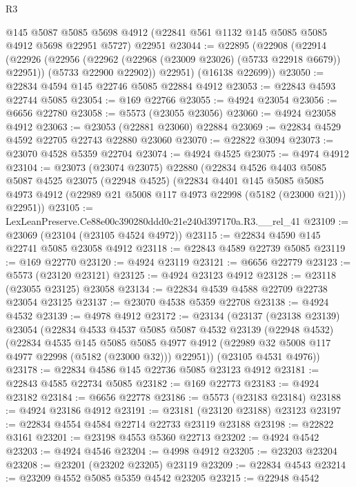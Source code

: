 \begin{lexlean}{R3}
\begin{coremodule}
    @145
    @5087
    @5085
    @5698
    @4912
    (@22841 @561 @1132 @145 @5085 @5085 @4912 @5698 @22951 @5727)
    @22951
@23044 := @22895
    (@22908
      (@22914
        (@22926
          (@22956 (@22962 (@22968 (@23009 @23026) (@5733 @22918 @6679)) @22951))
          (@5733 @22900 @22902))
        @22951)
      (@16138 @22699))
@23050 := @22834 @4594 @145 @22746 @5085 @22884 @4912
@23053 := @22843 @4593 @22744 @5085
@23054 := @169 @22766
@23055 := @4924 @23054
@23056 := @6656 @22780
@23058 := @5573 (@23055 @23056)
@23060 := @4924 @23058 @4912
@23063 := @23053 (@22881 @23060) @22884
@23069 := @22834 @4529 @4592 @22705 @22743 @22880 @23060
@23070 := @22822 @3094
@23073 := @23070 @4528 @5359 @22704
@23074 := @4924 @4525
@23075 := @4974 @4912
@23104 := @23073
    (@23074 @23075)
    @22880
    (@22834
      @4526
      @4403
      @5085
      @5087
      @4525
      @23075
      (@22948 @4525)
      (@22834
        @4401
        @145
        @5085
        @5085
        @4973
        @4912
        (@22989 @21 @5008 @117 @4973 @22998 (@5182 (@23000 @21)))
        @22951))
@23105 := LexLeanPreserve.Ce88e00c390280ddd0c21e240d397170a.R3.__rel_41
@23109 := @23069 (@23104 (@23105 @4524 @4972))
@23115 := @22834 @4590 @145 @22741 @5085 @23058 @4912
@23118 := @22843 @4589 @22739 @5085
@23119 := @169 @22770
@23120 := @4924 @23119
@23121 := @6656 @22779
@23123 := @5573 (@23120 @23121)
@23125 := @4924 @23123 @4912
@23128 := @23118 (@23055 @23125) @23058
@23134 := @22834 @4539 @4588 @22709 @22738 @23054 @23125
@23137 := @23070 @4538 @5359 @22708
@23138 := @4924 @4532
@23139 := @4978 @4912
@23172 := @23134
    (@23137
      (@23138 @23139)
      @23054
      (@22834
        @4533
        @4537
        @5085
        @5087
        @4532
        @23139
        (@22948 @4532)
        (@22834
          @4535
          @145
          @5085
          @5085
          @4977
          @4912
          (@22989 @32 @5008 @117 @4977 @22998 (@5182 (@23000 @32)))
          @22951))
      (@23105 @4531 @4976))
@23178 := @22834 @4586 @145 @22736 @5085 @23123 @4912
@23181 := @22843 @4585 @22734 @5085
@23182 := @169 @22773
@23183 := @4924 @23182
@23184 := @6656 @22778
@23186 := @5573 (@23183 @23184)
@23188 := @4924 @23186 @4912
@23191 := @23181 (@23120 @23188) @23123
@23197 := @22834 @4554 @4584 @22714 @22733 @23119 @23188
@23198 := @22822 @3161
@23201 := @23198 @4553 @5360 @22713
@23202 := @4924 @4542
@23203 := @4924 @4546
@23204 := @4998 @4912
@23205 := @23203 @23204
@23208 := @23201 (@23202 @23205) @23119
@23209 := @22834 @4543
@23214 := @23209 @4552 @5085 @5359 @4542 @23205
@23215 := @22948 @4542

\end{coremodule}
\end{lexlean}
